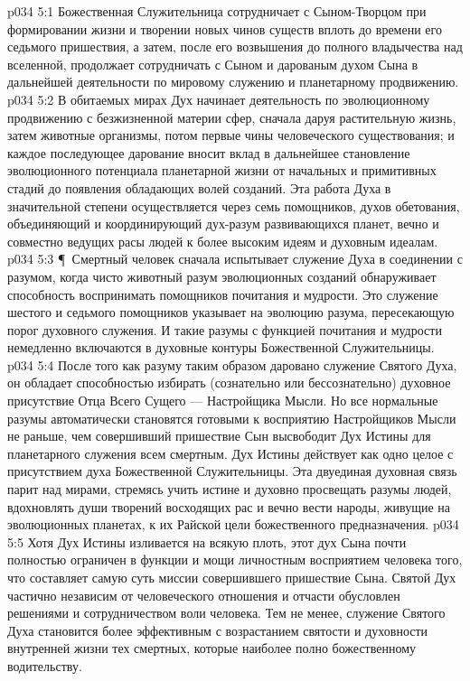 \vs p034 5:1 Божественная Служительница сотрудничает с Сыном\hyp{}Творцом при формировании жизни и творении новых чинов существ вплоть до времени его седьмого пришествия, а затем, после его возвышения до полного владычества над вселенной, продолжает сотрудничать с Сыном и дарованым духом Сына в дальнейшей деятельности по мировому служению и планетарному продвижению.
\vs p034 5:2 В обитаемых мирах Дух начинает деятельность по эволюционному продвижению с безжизненной материи сфер, сначала даруя растительную жизнь, затем животные организмы, потом первые чины человеческого существования; и каждое последующее дарование вносит вклад в дальнейшее становление эволюционного потенциала планетарной жизни от начальных и примитивных стадий до появления обладающих волей созданий. Эта работа Духа в значительной степени осуществляется через семь помощников, духов обетования, объединяющий и координирующий дух\hyp{}разум развивающихся планет, вечно и совместно ведущих расы людей к более высоким идеям и духовным идеалам.
\vs p034 5:3 \P\ Смертный человек сначала испытывает служение Духа в соединении с разумом, когда чисто животный разум эволюционных созданий обнаруживает способность воспринимать помощников почитания и мудрости. Это служение шестого и седьмого помощников указывает на эволюцию разума, пересекающую порог духовного служения. И такие разумы с функцией почитания и мудрости немедленно включаются в духовные контуры Божественной Служительницы.
\vs p034 5:4 После того как разуму таким образом даровано служение Святого Духа, он обладает способностью избирать (сознательно или бессознательно) духовное присутствие Отца Всего Сущего --- Настройщика Мысли. Но все нормальные разумы автоматически становятся готовыми к восприятию Настройщиков Мысли не раньше, чем совершивший пришествие Сын высвободит Дух Истины для планетарного служения всем смертным. Дух Истины действует как одно целое с присутствием духа Божественной Служительницы. Эта двуединая духовная связь парит над мирами, стремясь учить истине и духовно просвещать разумы людей, вдохновлять души творений восходящих рас и вечно вести народы, живущие на эволюционных планетах, к их Райской цели божественного предназначения.
\vs p034 5:5 Хотя Дух Истины изливается на всякую плоть, этот дух Сына почти полностью ограничен в функции и мощи личностным восприятием человека того, что составляет самую суть миссии совершившего пришествие Сына. Святой Дух частично независим от человеческого отношения и отчасти обусловлен решениями и сотрудничеством воли человека. Тем не менее, служение Святого Духа становится более эффективным с возрастанием святости и духовности внутренней жизни тех смертных, которые наиболее полно  божественному водительству.
